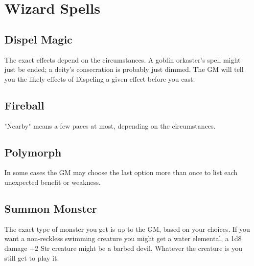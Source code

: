 \chapter{Wizard Spells}
   
 
\section{Dispel Magic}    
 

The exact effects depend on the circumstances. A goblin orkaster's spell might just be ended; a deity's consecration is probably just dimmed. The GM will tell you the likely effects of Dispeling a given effect before you cast.

 
\section{Fireball}   
 

"Nearby" means a few paces at most, depending on the circumstances.

 
\section{Polymorph}   
 

In some cases the GM may choose the last option more than once to list each unexpected benefit or weakness.

 
\section{Summon Monster}    
 

The exact type of monster you get is up to the GM, based on your choices. If you want a non-reckless swimming creature you might get a water elemental, a 1d8 damage +2 Str creature might be a barbed devil. Whatever the creature is you still get to play it.



 




